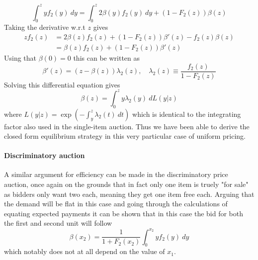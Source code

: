 \begin{equation}
    \int_0^{z} y f_2(y) \ dy = 
    \int_0^{z} 2 \beta(y)f_2(y) \ dy 
    + (1- F_2(z)) \beta(z)   
\end{equation}
Taking the derivative w.r.t $z$ gives 
\begin{equation}
    \begin{split}
    z f_2(z) &= 2 \beta(z) f_2(z) + (1-F_2(z)) \beta'(z) - f_2(z)\beta(z)  \\ 
    &=\beta(z) f_2(z) + (1-F_2(z)) \beta'(z)
    \end{split} 
\end{equation}
Using that $\beta(0)=0$ this can be written as 
\begin{equation}
    \beta'(z) = (z-\beta(z)) \lambda_2(z), \quad \lambda_2(z) \equiv \frac{f_2(z)}{1- F_2(z)}
\end{equation}
Solving this differential equation gives 
\begin{equation}
    \beta(z) = \int_0^z y \lambda_2(y) \ dL(y|z)
\end{equation}
where $L(y|z)=\exp \left(- \int_y^z   \lambda_2(t) \ dt \right)$ which is identical to the integrating factor also used in the single-item auction. Thus we have been able to derive the closed form equilibrium strategy in this very particular case of uniform pricing. 

\paragraph{Discriminatory auction} 
A similar argument for efficiency can be made in the discriminatory price auction, once again on the grounds that in fact only one item is truely "for sale" as bidders only want two each, meaning they get one item free each. Arguing that the demand will be flat in this case and going through the calculations of equating expected payments it can be shown that in this case the bid for both the first and second unit will follow 
\begin{equation}
    \beta(x_2) = \frac{1}{1 + F_2(x_2)} \int_0^{x_2} y f_2(y) \ dy
\end{equation}
which notably does not at all depend on the value of $x_1$.